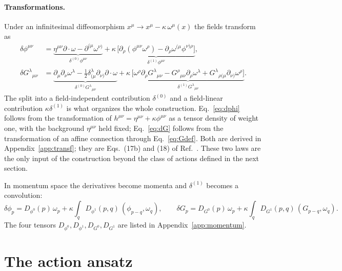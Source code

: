 \documentclass[prd,aps,preprint,superscriptaddress,nofootinbib,amsmath,amssymb,eqsecnum]{revtex4-2}
\newcommand{\ip}[1]{\int_{#1}}
\begin{document}
\paragraph{Transformations.} Under an infinitesimal diffeomorphism
$x^\mu\to x^\mu-\kappa\,\omega^\mu(x)$ the fields transform as
\begin{align}
\delta\phi^{\mu\nu}&=
\underbrace{\eta^{\mu\nu}\partial\!\cdot\!\omega-\partial^{(\mu}\omega^{\nu)}}_{\delta^{(0)}\phi^{\mu\nu}}
+\kappa\,\underbrace{\big[\partial_\rho(\phi^{\mu\nu}\omega^\rho)-\partial_\rho\omega^{(\mu}\phi^{\nu)\rho}\big]}_{\delta^{(1)}\phi^{\mu\nu}},
\label{eq:dphi}\\
\delta G^{\lambda}{}_{\mu\nu}&=
\underbrace{\partial_\mu\partial_\nu\omega^\lambda-\tfrac12\delta^{\lambda}_{(\mu}\partial_{\nu)}\partial\!\cdot\!\omega}_{\delta^{(0)}G^{\lambda}{}_{\mu\nu}}
+\kappa\,\underbrace{\big[\omega^\rho\partial_\rho G^{\lambda}{}_{\mu\nu}-G^{\rho}{}_{\mu\nu}\partial_\rho\omega^\lambda
+G^{\lambda}{}_{\rho(\mu}\partial_{\nu)}\omega^\rho\big]}_{\delta^{(1)}G^{\lambda}{}_{\mu\nu}}.
\label{eq:dG}
\end{align}
The split into a field-independent contribution $\delta^{(0)}$ and a field-linear contribution
$\kappa\delta^{(1)}$ is what organizes the whole construction.
Eq.~\eqref{eq:dphi} follows from the transformation of $h^{\mu\nu}=\eta^{\mu\nu}+\kappa\phi^{\mu\nu}$
as a tensor density of weight one, with the background $\eta^{\mu\nu}$ held fixed;
Eq.~\eqref{eq:dG} follows from the transformation of an affine connection through
Eq.~\eqref{eq:Gdef}. Both are derived in Appendix~\ref{app:transf}; they are
Eqs.~(17b) and (18) of Ref.~\cite{BrandtMcKeon2015}. These two laws are the only input of the
construction beyond the class of actions defined in the next section.

In momentum space the derivatives become momenta and $\delta^{(1)}$ becomes a convolution:
\begin{equation}
\delta\phi_p=D_{\phi^0}(p)\,\omega_p+\kappa\ip{q}D_{\phi^1}(p,q)\,(\phi_{p-q},\omega_q),\qquad
\delta G_p=D_{G^0}(p)\,\omega_p+\kappa\ip{q}D_{G^1}(p,q)\,(G_{p-q},\omega_q).
\label{eq:dmom}
\end{equation}
The four tensors $D_{\phi^0},D_{\phi^1},D_{G^0},D_{G^1}$ are listed in Appendix~\ref{app:momentum}.

\section{The action ansatz}
\label{sec:ansatz}
\end{document}
